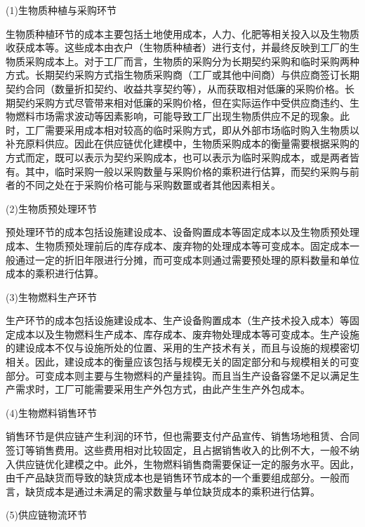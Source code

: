 (1)生物质种植与采购环节

生物质种植环节的成本主要包括土地使用成本，人力、化肥等相关投入以及生物质收获成本等\cite{Osmani2013}。这些成本由衣户（生物质种植者）进行支付，并最终反映到工厂的生物质采购成本上。对于工厂而言，生物质的采购分为长期契约采购和临时采购两种方式\cite{Correll2014}。长期契约采购方式指生物质采购商（工厂或其他中间商）与供应商签订长期契约合同（数量折扣契约、收益共享契约等），从而获取相对低廉的采购价格。长期契约采购方式尽管带来相对低廉的采购价格，但在实际运作中受供应商违约、生物燃料市场需求波动等因素影响，可能导致工厂出现生物质供应不足的现象。此时，工厂需要采用成本相对较高的临时采购方式，即从外部市场临时购入生物质以补充原料供应。因此在供应链优化建模中，生物质采购成本的衡量需要根据采购的方式而定，既可以表示为契约采购成本，也可以表示为临时采购成本，或是两者皆有。其中，临时采购一般以采购数量与采购价格的乘积进行估算\cite{Chen2012}，而契约采购与前者的不同之处在于采购价格可能与采购数噩或者其他因素相关。

(2)生物质预处理环节

预处理环节的成本包括设施建设成本、设备购置成本等固定成本以及生物质预处理成本、生物质预处理前后的库存成本、废弃物的处理成本等可变成本。固定成本一般通过一定的折旧年限进行分摊，而可变成本则通过需要预处理的原料数量和单位成本的乘积进行估算\cite{Chaabane2012}。

(3)生物燃料生产环节

生产环节的成本包括设施建设成本、生产设备购置成本（生产技术投入成本）等固定成本以及生物燃料生产成本、库存成本、废弃物处理成本等可变成本\cite{Jiang2014}。生产设施的建设成本不仅与设施所处的位置、采用的生产技术有关，而且与设施的规模密切相关。因此，建设成本的衡量应该包括与规模无关的固定部分和与规模相关的可变部分\cite{Chen2012,Sabio2012}。可变成本则主要与生物燃料的产量挂钩。而且当生产设备容堡不足以满足生产需求时，工厂可能需要采用生产外包方式，由此产生生产外包成本\cite{Akgul2012}。

(4)生物燃料销售环节

销售环节是供应链产生利润的环节，但也需要支付产品宣传、销售场地租赁、合同签订等销售费用。这些费用相对比较固定，且占据销售收入的比例不大，一般不纳入供应链优化建模之中。此外，生物燃料销售商需要保证一定的服务水平。因此，由千产品缺货而导致的缺货成本也是销售环节成本的一个重要组成部分\cite{Osmani2013}\cite{Li2014}。一般而言，缺货成本是通过未满足的需求数量与单位缺货成本的乘积进行估算。

(5)供应链物流环节

